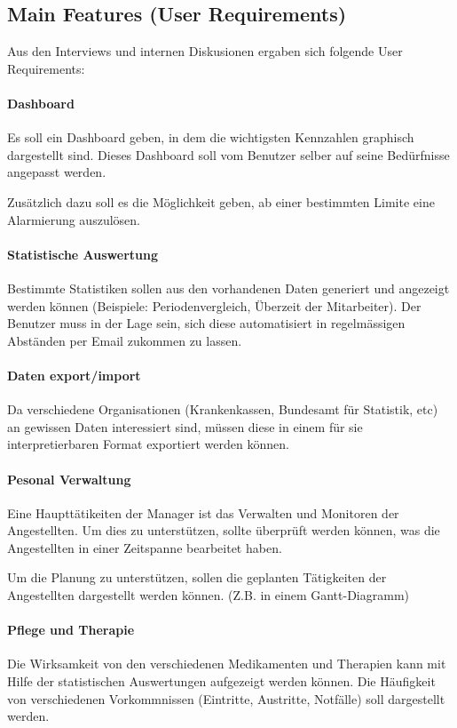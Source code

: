 \documentclass[a4paper]{scrreprt}
\begin{document}
\subsection{Main Features (User Requirements)}
Aus den Interviews und internen Diskusionen ergaben sich folgende User Requirements:

\paragraph{Dashboard}
Es soll ein Dashboard geben, in dem die wichtigsten Kennzahlen graphisch dargestellt sind. Dieses Dashboard soll vom Benutzer selber auf seine Bedürfnisse angepasst werden. 

Zusätzlich dazu soll es die Möglichkeit geben, ab einer bestimmten Limite eine Alarmierung auszulösen. 

\paragraph{Statistische Auswertung}
Bestimmte Statistiken sollen aus den vorhandenen Daten generiert und angezeigt werden können (Beispiele: Periodenvergleich, Überzeit der Mitarbeiter). Der Benutzer muss in der Lage sein, sich diese automatisiert in regelmässigen Abständen per Email zukommen zu lassen.

\paragraph{Daten export/import}
Da verschiedene Organisationen (Krankenkassen, Bundesamt für Statistik, etc) an gewissen Daten interessiert sind, müssen diese in einem für sie interpretierbaren Format exportiert werden können. 

\paragraph{Pesonal Verwaltung}
Eine Haupttätikeiten der Manager ist das Verwalten und Monitoren der Angestellten. Um dies zu unterstützen, sollte überprüft werden können, was die Angestellten in einer Zeitspanne bearbeitet haben. 

Um die Planung zu unterstützen, sollen die geplanten Tätigkeiten der Angestellten dargestellt werden können. (Z.B. in einem Gantt-Diagramm)

\paragraph{Pflege und Therapie}
Die Wirksamkeit von den verschiedenen Medikamenten und Therapien kann mit Hilfe der statistischen Auswertungen aufgezeigt werden können. Die Häufigkeit von verschiedenen Vorkommnissen (Eintritte, Austritte, Notfälle) soll dargestellt werden. 
\end{document}
